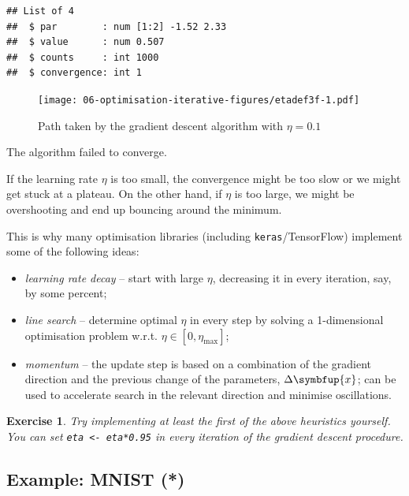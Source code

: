 \documentclass[10pt,b5paper,krantz1]{krantz}
\newtheorem{exercise}{Exercise}[chapter]
\renewcommand{\mathbf}[1]{\symbfup{#1}}
\begin{document}
\begin{verbatim}
## List of 4
##  $ par        : num [1:2] -1.52 2.33
##  $ value      : num 0.507
##  $ counts     : int 1000
##  $ convergence: int 1
\end{verbatim}

\begin{figure}
\hypertarget{fig:etadef3f}{%
\centering
\texttt{[image: 06-optimisation-iterative-figures/etadef3f-1.pdf]}
\caption{Path taken by the gradient descent algorithm with \(\eta=0.1\)}\label{fig:etadef3f}
}
\end{figure}

The algorithm failed to converge.

\bigskip

If the learning rate \(\eta\) is too small, the convergence might be too slow
or we might get stuck at a plateau.
On the other hand, if \(\eta\) is too large, we might be overshooting
and end up bouncing around the minimum.

This is why many optimisation libraries (including \texttt{keras}/TensorFlow)
implement some
of the following ideas:

\begin{itemize}
\item
  \emph{learning rate decay} -- start with large \(\eta\),
  decreasing it in every iteration, say, by some percent;
\item
  \emph{line search} -- determine optimal \(\eta\) in every step
  by solving a 1-dimensional optimisation problem w.r.t.
  \(\eta\in[0,\eta_{\max}]\);
\item
  \emph{momentum} -- the update step is based on a combination of the gradient direction
  and the previous change of the parameters, \(\Delta\mathbf{x}\);
  can be used to accelerate search in the relevant direction
  and minimise oscillations.
\end{itemize}

\begin{exercise}

Try implementing at least the first of the above
heuristics yourself. You can set \texttt{eta\ \textless{}-\ eta*0.95} in every iteration
of the gradient descent procedure.

\end{exercise}

\hypertarget{example-mnist}{%
\subsection{Example: MNIST (*)}\label{example-mnist}}
\end{document}
